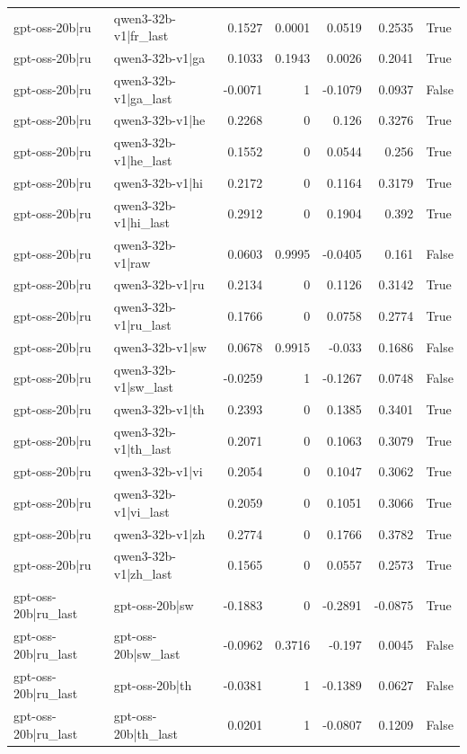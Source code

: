 \begin{table}
\begin{tabular}{l l r r r r l}
gpt-oss-20b|ru & qwen3-32b-v1|fr_last & 0.1527 & 0.0001 & 0.0519 & 0.2535 & True \\
gpt-oss-20b|ru & qwen3-32b-v1|ga & 0.1033 & 0.1943 & 0.0026 & 0.2041 & True \\
gpt-oss-20b|ru & qwen3-32b-v1|ga_last & -0.0071 & 1 & -0.1079 & 0.0937 & False \\
gpt-oss-20b|ru & qwen3-32b-v1|he & 0.2268 & 0 & 0.126 & 0.3276 & True \\
gpt-oss-20b|ru & qwen3-32b-v1|he_last & 0.1552 & 0 & 0.0544 & 0.256 & True \\
gpt-oss-20b|ru & qwen3-32b-v1|hi & 0.2172 & 0 & 0.1164 & 0.3179 & True \\
gpt-oss-20b|ru & qwen3-32b-v1|hi_last & 0.2912 & 0 & 0.1904 & 0.392 & True \\
gpt-oss-20b|ru & qwen3-32b-v1|raw & 0.0603 & 0.9995 & -0.0405 & 0.161 & False \\
gpt-oss-20b|ru & qwen3-32b-v1|ru & 0.2134 & 0 & 0.1126 & 0.3142 & True \\
gpt-oss-20b|ru & qwen3-32b-v1|ru_last & 0.1766 & 0 & 0.0758 & 0.2774 & True \\
gpt-oss-20b|ru & qwen3-32b-v1|sw & 0.0678 & 0.9915 & -0.033 & 0.1686 & False \\
gpt-oss-20b|ru & qwen3-32b-v1|sw_last & -0.0259 & 1 & -0.1267 & 0.0748 & False \\
gpt-oss-20b|ru & qwen3-32b-v1|th & 0.2393 & 0 & 0.1385 & 0.3401 & True \\
gpt-oss-20b|ru & qwen3-32b-v1|th_last & 0.2071 & 0 & 0.1063 & 0.3079 & True \\
gpt-oss-20b|ru & qwen3-32b-v1|vi & 0.2054 & 0 & 0.1047 & 0.3062 & True \\
gpt-oss-20b|ru & qwen3-32b-v1|vi_last & 0.2059 & 0 & 0.1051 & 0.3066 & True \\
gpt-oss-20b|ru & qwen3-32b-v1|zh & 0.2774 & 0 & 0.1766 & 0.3782 & True \\
gpt-oss-20b|ru & qwen3-32b-v1|zh_last & 0.1565 & 0 & 0.0557 & 0.2573 & True \\
gpt-oss-20b|ru_last & gpt-oss-20b|sw & -0.1883 & 0 & -0.2891 & -0.0875 & True \\
gpt-oss-20b|ru_last & gpt-oss-20b|sw_last & -0.0962 & 0.3716 & -0.197 & 0.0045 & False \\
gpt-oss-20b|ru_last & gpt-oss-20b|th & -0.0381 & 1 & -0.1389 & 0.0627 & False \\
gpt-oss-20b|ru_last & gpt-oss-20b|th_last & 0.0201 & 1 & -0.0807 & 0.1209 & False \\

\end{tabular}
\end{table}
